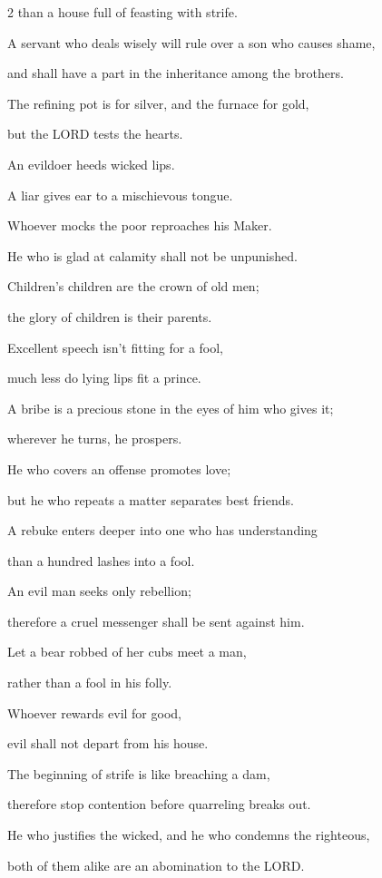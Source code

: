 \begin{multicols}{2}
\quad\quad than a house full of feasting with strife.


\myverse{}A servant who deals wisely will rule over a son who causes shame,

and shall have a part in the inheritance among the brothers.


\myverse{}The refining pot is for silver, and the furnace for gold,

but the LORD tests the hearts.


\myverse{}An evildoer heeds wicked lips.

A liar gives ear to a mischievous tongue.


\myverse{}Whoever mocks the poor reproaches his Maker.

He who is glad at calamity shall not be unpunished.


\myverse{}Children’s children are the crown of old men;

the glory of children is their parents.


\myverse{}Excellent speech isn’t fitting for a fool,

much less do lying lips fit a prince.


\myverse{}A bribe is a precious stone in the eyes of him who gives it;

wherever he turns, he prospers.


\myverse{}He who covers an offense promotes love;

but he who repeats a matter separates best friends.


\myverse{}A rebuke enters deeper into one who has understanding

than a hundred lashes into a fool.


\myverse{}An evil man seeks only rebellion;

therefore a cruel messenger shall be sent against him.


\myverse{}Let a bear robbed of her cubs meet a man,

rather than a fool in his folly.


\myverse{}Whoever rewards evil for good,

evil shall not depart from his house.


\myverse{}The beginning of strife is like breaching a dam,

therefore stop contention before quarreling breaks out.


\myverse{}He who justifies the wicked, and he who condemns the righteous,

both of them alike are an abomination to the LORD.



\end{multicols}
